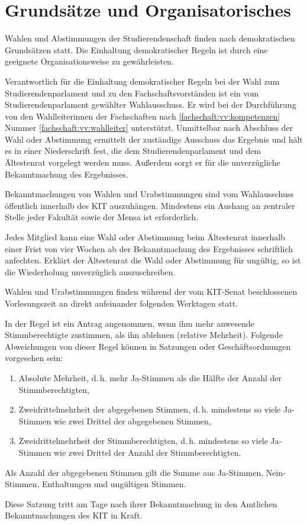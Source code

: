 %
%

\parnumberfalse \section{Grundsätze und Organisatorisches} \parnumbertrue

\label{grundsaetze:wahlen}

Wahlen und Abstimmungen der Studierendenschaft finden nach demokratischen Grundsätzen statt. Die Einhaltung demokratischer Regeln ist durch eine geeignete Organisationsweise zu gewährleisten.

Verantwortlich für die Einhaltung demokratischer Regeln bei der Wahl zum Studierendenparlament und zu den Fachschaftsvorständen ist ein vom Studierendenparlament gewählter Wahlausschuss. Er wird bei der Durchführung von den Wahlleiterinnen der Fachschaften nach \ref{fachschaft:vv:kompetenzen} Nummer \ref{fachschaft:vv:wahlleiter} unterstützt. Unmittelbar nach Abschluss der Wahl oder Abstimmung ermittelt der zuständige Ausschuss das Ergebnis und hält es in einer Niederschrift fest, die dem Studierendenparlament und dem Ältestenrat vorgelegt werden muss. Außerdem sorgt er für die unverzügliche Bekanntmachung des Ergebnisses. \label{grundsaetze:wahlen:wahlausschuss}

Bekanntmachungen von Wahlen und Urabstimmungen sind vom Wahlausschuss öffentlich innerhalb des KIT auszuhängen. Mindestens ein Aushang an zentraler Stelle jeder Fakultät sowie der Mensa ist erforderlich. \label{grundsaetze:wahlen:bekanntmachung}

Jedes Mitglied kann eine Wahl oder Abstimmung beim Ältestenrat innerhalb einer Frist von vier Wochen ab der Bekanntmachung des Ergebnisses schriftlich anfechten. Erklärt der Ältestenrat die Wahl oder Abstimmung für ungültig, so ist die Wiederholung unverzüglich auszuschreiben. \label{grundsaetze:wahlen:wahlanfechtung}

Wahlen und Urabstimmungen finden während der vom KIT-Senat beschlossenen Vorlesungszeit an direkt aufeinander folgenden Werktagen statt.

\parnumberfalse In der Regel ist ein Antrag angenommen, wenn ihm mehr anwesende Stimmberechtigte zustimmen, als ihn ablehnen (relative Mehrheit). Folgende Abweichungen von dieser Regel können in Satzungen oder Geschäftsordnungen vorgesehen sein:
\begin{enumerate}
\item Absolute Mehrheit, d.\,h. mehr Ja-Stimmen als die Hälfte der Anzahl der Stimmberechtigten,
\item Zweidrittelmehrheit der abgegebenen Stimmen, d.\,h. mindestens so viele Ja-Stimmen wie zwei Drittel der abgegebenen Stimmen,
\item Zweidrittelmehrheit der Stimmberechtigten, d.\,h. mindestens so viele Ja-Stimmen wie zwei Drittel der Anzahl der Stimmberechtigten.
\end{enumerate}
Als Anzahl der abgegebenen Stimmen gilt die Summe aus Ja-Stimmen, Nein-Stimmen, Enthaltungen und ungültigen Stimmen.\parnumbertrue


\label{grundsaetze:inkrafttreten}
\parnumberfalse Diese Satzung tritt am Tage nach ihrer Bekanntmachung in den Amtlichen Bekanntmachungen des KIT in Kraft.\parnumbertrue

